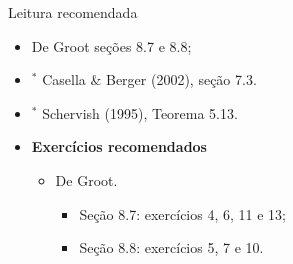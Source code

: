 \begin{frame}{Leitura recomendada}
\begin{itemize}
 \item[\faBook] De Groot seções 8.7 e 8.8;
 \item[\faBook] $^\ast$ Casella \& Berger (2002), seção 7.3.
 \item[\faBook] $^\ast$ Schervish (1995), Teorema  5.13.
 \item {\large\textbf{Exercícios recomendados}}
 \begin{itemize}
  \item[\faBookmark] De Groot.
  \begin{itemize}
   \item Seção 8.7: exercícios 4, 6, 11 e 13;
   \item Seção 8.8: exercícios 5, 7 e 10.
  \end{itemize}   
  \end{itemize}
 \end{itemize} 
\end{frame}


